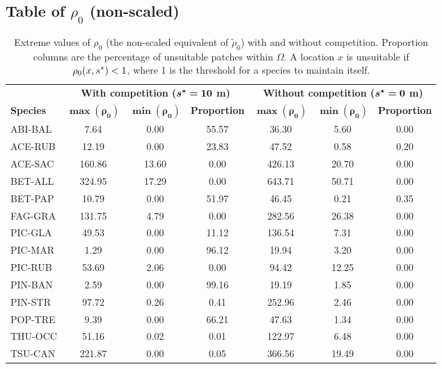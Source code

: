 \begin{refsection}
\subsection{Table of $ \rho_0 $ (\ie non-scaled)}
\begin{table}[ht]
\centering
\caption{Extreme values of $ \rho_0 $ (\ie the non-scaled equivalent of $ \tilde \rho_0 $) with and without competition. Proportion columns are the percentage of unsuitable patches within $ \Omega $. A location $ x $ is unsuitable if $ \rho_0(x, {s}^{*}) < 1 $, where 1 is the threshold for a species to maintain itself. \label{tab::R0_min_max}}
\begin{tabular}{lcccccc}
	\toprule
		~ & \multicolumn{3}{c}{\textbf{With competition ($ \bm {{s}^{*} = 10} $ m)}} & \multicolumn{3}{c}{\textbf{Without competition ($ \bm {{s}^{*} = 0} $ m)}} \\
	\cmidrule(lr){2-4} \cmidrule(lr){5-7}
		\textbf{Species} & $ \bm{\max(\rho_0)} $ & $ \bm{\min(\rho_0)} $ & \textbf{Proportion} & $ \bm{\max(\rho_0)} $ & $ \bm{\min(\rho_0)} $ & \textbf{Proportion} \\
	\midrule
		ABI-BAL & 7.64 & 0.00 & 55.57 & 36.30 & 5.60 & 0.00 \\
		ACE-RUB & 12.19 & 0.00 & 23.83 & 47.52 & 0.58 & 0.20 \\
		ACE-SAC & 160.86 & 13.60 & 0.00 & 426.13 & 20.70 & 0.00 \\
		BET-ALL & 324.95 & 17.29 & 0.00 & 643.71 & 50.71 & 0.00 \\
		BET-PAP & 10.79 & 0.00 & 51.97 & 46.45 & 0.21 & 0.35 \\
		FAG-GRA & 131.75 & 4.79 & 0.00 & 282.56 & 26.38 & 0.00 \\
		PIC-GLA & 49.53 & 0.00 & 11.12 & 136.54 & 7.31 & 0.00 \\
		PIC-MAR & 1.29 & 0.00 & 96.12 & 19.94 & 3.20 & 0.00 \\
		PIC-RUB & 53.69 & 2.06 & 0.00 & 94.42 & 12.25 & 0.00 \\
		PIN-BAN & 2.59 & 0.00 & 99.16 & 19.19 & 1.85 & 0.00 \\
		PIN-STR & 97.72 & 0.26 & 0.41 & 252.96 & 2.46 & 0.00 \\
		POP-TRE & 9.39 & 0.00 & 66.21 & 47.63 & 1.34 & 0.00 \\
		THU-OCC & 51.16 & 0.02 & 0.01 & 122.97 & 6.48 & 0.00 \\
		TSU-CAN & 221.87 & 0.00 & 0.05 & 366.56 & 19.49 & 0.00 \\
	\bottomrule
\end{tabular}
\end{table}

\printbibliography[heading=subbibliography]
\end{refsection}
